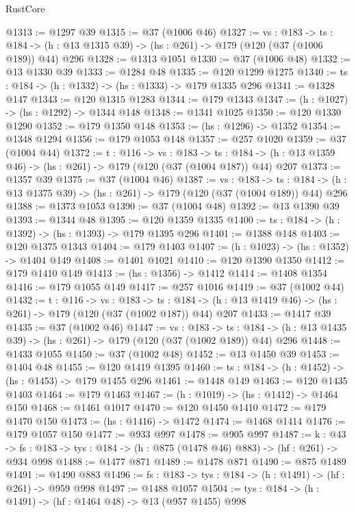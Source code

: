 \begin{lexlean}{RustCore}
\begin{coremodule}
@1313 := @1297 @39
@1315 := @37 (@1006 @46)
@1327 := {vs : @183} ->
  {ts : @184} -> (h : @13 @1315 @39) -> (hs : @261) -> @179 (@120 (@37 (@1006 @189)) @44) @296
@1328 := @1313 @1051
@1330 := @37 (@1006 @48)
@1332 := @13 @1330 @39
@1333 := @1284 @48
@1335 := @120 @1299 @1275
@1340 := {ts : @184} -> (h : @1332) -> (hs : @1333) -> @179 @1335 @296
@1341 := @1328 @147
@1343 := @120 @1315 @1283
@1344 := @179 @1343
@1347 := (h : @1027) -> (hs : @1292) -> @1344 @148
@1348 := @1341 @1025
@1350 := @120 @1330 @1290
@1352 := @179 @1350 @148
@1353 := (hs : @1296) -> @1352
@1354 := @1348 @1294
@1356 := @179 @1053 @148
@1357 := @257 @1020
@1359 := @37 (@1004 @44)
@1372 := {t : @116} ->
  {vs : @183} ->
  {ts : @184} -> (h : @13 @1359 @46) -> (hs : @261) -> @179 (@120 (@37 (@1004 @187)) @44) @207
@1373 := @1357 @39
@1375 := @37 (@1004 @46)
@1387 := {vs : @183} ->
  {ts : @184} -> (h : @13 @1375 @39) -> (hs : @261) -> @179 (@120 (@37 (@1004 @189)) @44) @296
@1388 := @1373 @1053
@1390 := @37 (@1004 @48)
@1392 := @13 @1390 @39
@1393 := @1344 @48
@1395 := @120 @1359 @1335
@1400 := {ts : @184} -> (h : @1392) -> (hs : @1393) -> @179 @1395 @296
@1401 := @1388 @148
@1403 := @120 @1375 @1343
@1404 := @179 @1403
@1407 := (h : @1023) -> (hs : @1352) -> @1404 @149
@1408 := @1401 @1021
@1410 := @120 @1390 @1350
@1412 := @179 @1410 @149
@1413 := (hs : @1356) -> @1412
@1414 := @1408 @1354
@1416 := @179 @1055 @149
@1417 := @257 @1016
@1419 := @37 (@1002 @44)
@1432 := {t : @116} ->
  {vs : @183} ->
  {ts : @184} -> (h : @13 @1419 @46) -> (hs : @261) -> @179 (@120 (@37 (@1002 @187)) @44) @207
@1433 := @1417 @39
@1435 := @37 (@1002 @46)
@1447 := {vs : @183} ->
  {ts : @184} -> (h : @13 @1435 @39) -> (hs : @261) -> @179 (@120 (@37 (@1002 @189)) @44) @296
@1448 := @1433 @1055
@1450 := @37 (@1002 @48)
@1452 := @13 @1450 @39
@1453 := @1404 @48
@1455 := @120 @1419 @1395
@1460 := {ts : @184} -> (h : @1452) -> (hs : @1453) -> @179 @1455 @296
@1461 := @1448 @149
@1463 := @120 @1435 @1403
@1464 := @179 @1463
@1467 := (h : @1019) -> (hs : @1412) -> @1464 @150
@1468 := @1461 @1017
@1470 := @120 @1450 @1410
@1472 := @179 @1470 @150
@1473 := (hs : @1416) -> @1472
@1474 := @1468 @1414
@1476 := @179 @1057 @150
@1477 := @933 @997
@1478 := @905 @997
@1487 := {k : @43} ->
  {fs : @183} -> {tys : @184} -> (h : @875 (@1478 @46) @883) -> (hf : @261) -> @934 @998
@1488 := @1477 @871
@1489 := @1478 @871
@1490 := @875 @1489
@1491 := @1490 @883
@1496 := {fs : @183} -> {tys : @184} -> (h : @1491) -> (hf : @261) -> @959 @998
@1497 := @1488 @1057
@1504 := {tys : @184} -> (h : @1491) -> (hf : @1464 @48) -> @13 (@957 @1455) @998

\end{coremodule}
\end{lexlean}
